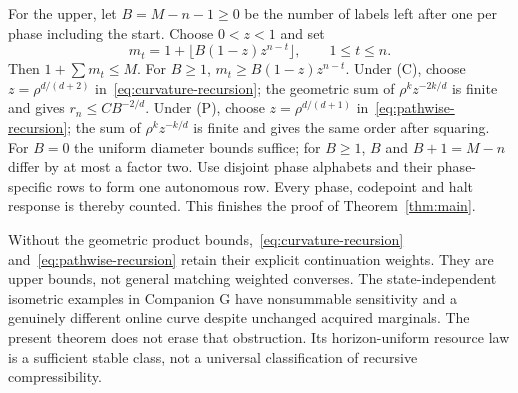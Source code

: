 For the upper, let $B=M-n-1\ge0$ be the number of labels left after one per phase including the start. Choose $0<z<1$ and set
\begin{equation}\label{eq:allocation}
 m_t=1+\lfloor B(1-z)z^{n-t}\rfloor,\qquad 1\le t\le n.
\end{equation}
Then $1+\sum m_t\le M$. For $B\ge1$, $m_t\ge B(1-z)z^{n-t}$. Under (C), choose $z=\rho^{d/(d+2)}$ in~\eqref{eq:curvature-recursion}; the geometric sum of $\rho^kz^{-2k/d}$ is finite and gives $r_n\le CB^{-2/d}$. Under (P), choose $z=\rho^{d/(d+1)}$ in~\eqref{eq:pathwise-recursion}; the sum of $\rho^kz^{-k/d}$ is finite and gives the same order after squaring. For $B=0$ the uniform diameter bounds suffice; for $B\ge1$, $B$ and $B+1=M-n$ differ by at most a factor two. Use disjoint phase alphabets and their phase-specific rows to form one autonomous row. Every phase, codepoint and halt response is thereby counted. This finishes the proof of Theorem~\ref{thm:main}.

\begin{remark}\label{rem:profile}
Without the geometric product bounds,~\eqref{eq:curvature-recursion} and~\eqref{eq:pathwise-recursion} retain their explicit continuation weights. They are upper bounds, not general matching weighted converses. The state-independent isometric examples in Companion G have nonsummable sensitivity and a genuinely different online curve despite unchanged acquired marginals. The present theorem does not erase that obstruction. Its horizon-uniform resource law is a sufficient stable class, not a universal classification of recursive compressibility.
\end{remark}
